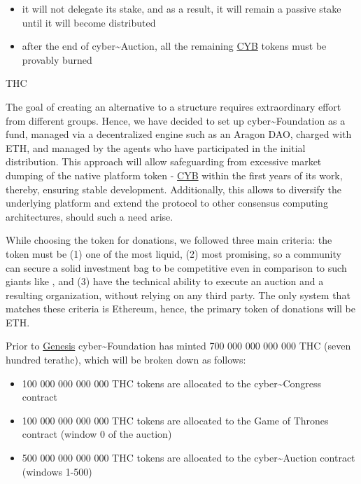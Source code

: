 \documentclass[8pt,oneside]{amsart}
\makeatletter
\newcommand{\linkred}[2]{\href{#1}{\color{red}{#2}}}
\renewcommand\subsection{\@startsection{subsection}
                                    {2}{\z@}
                                    {-3.25ex\@plus -1ex \@minus -.2ex}
                                    {0ex \@plus .2ex}
                                    {\play\Large}
                        }
\newcommand{\titleSection}[1]{\subsection{#1}}
\makeatother
\begin{document}
\begin{itemize}
\item it will not delegate its stake, and as a result, it will remain a passive stake until it will become distributed
\item after the end of cyber\~{}Auction, all the remaining {\hyperref[cyb]{CYB}} tokens must be provably burned
\end{itemize}

\titleSection{THC}\label{thc}

The goal of creating an alternative to a \linkred{https://google.com}{Google-like} structure requires extraordinary effort from different groups. Hence, we have decided to set up cyber\~{}Foundation as a fund, managed via a decentralized engine such as an Aragon DAO, charged with ETH, and managed by the agents who have participated in the initial distribution. This approach will allow safeguarding from excessive market dumping of the native platform token - {\hyperref[cyb]{CYB}} within the first years of its work, thereby, ensuring stable development. Additionally, this allows to diversify the underlying platform and extend the protocol to other consensus computing architectures, should such a need arise.

While choosing the token for donations, we followed three main criteria: the token must be (1) one of the most liquid, (2) most promising, so a community can secure a solid investment bag to be competitive even in comparison to such giants like \linkred{https://google.com}{Google}, and (3) have the technical ability to execute an auction and a resulting organization, without relying on any third party. The only system that matches these criteria is Ethereum, hence, the primary token of donations will be ETH.

Prior to \hyperlink{genesis}{Genesis} cyber\~{}Foundation has minted 700 000 000 000 000 THC (seven hundred terathc), which will be broken down as follows:

\begin{itemize}
\item 100 000 000 000 000 THC tokens are allocated to the cyber\~{}Congress contract
\item 100 000 000 000 000 THC tokens are allocated to the Game of Thrones contract (window 0 of the auction)
\item 500 000 000 000 000 THC tokens are allocated to the cyber\~{}Auction contract (windows 1-500)
\end{itemize}
\end{document}
